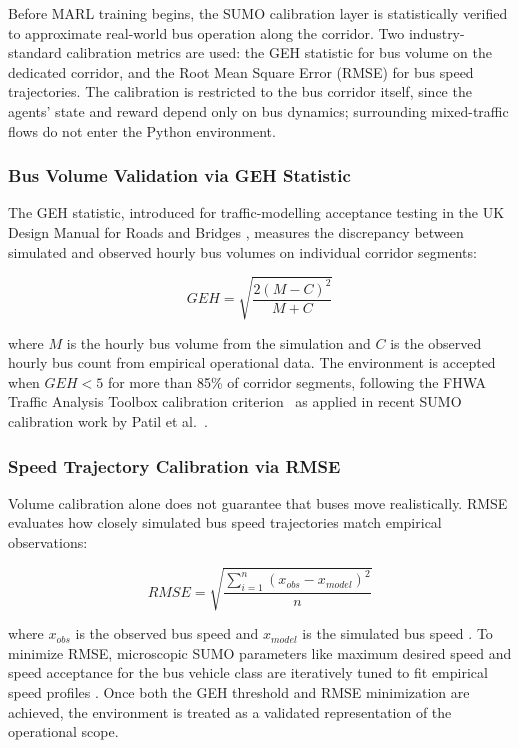 Before MARL training begins, the SUMO calibration layer is statistically verified to approximate real-world bus operation along the corridor. Two industry-standard calibration metrics are used: the GEH statistic for bus volume on the dedicated corridor, and the Root Mean Square Error (RMSE) for bus speed trajectories. The calibration is restricted to the bus corridor itself, since the agents' state and reward depend only on bus dynamics; surrounding mixed-traffic flows do not enter the Python environment.

\subsubsection{Bus Volume Validation via GEH Statistic}

The GEH statistic, introduced for traffic-modelling acceptance testing in the UK Design Manual for Roads and Bridges \cite{DMRBV12}, measures the discrepancy between simulated and observed hourly bus volumes on individual corridor segments:

\begin{equation} GEH = \sqrt{\frac{2(M - C)^2}{M + C}} \label{eq:geh} \end{equation}

where $M$ is the hourly bus volume from the simulation and $C$ is the observed hourly bus count from empirical operational data. The environment is accepted when $GEH < 5$ for more than 85\% of corridor segments, following the FHWA Traffic Analysis Toolbox calibration criterion~\cite{FHWA2019TAT} as applied in recent SUMO calibration work by Patil et al.~\cite{Patil2025Conformal}.

\subsubsection{Speed Trajectory Calibration via RMSE}

Volume calibration alone does not guarantee that buses move realistically. RMSE evaluates how closely simulated bus speed trajectories match empirical observations:

\begin{equation} RMSE = \sqrt{\frac{\sum_{i=1}^{n}(x_{obs} - x_{model})^2}{n}} \label{eq:rmse} \end{equation}

where $x_{obs}$ is the observed bus speed and $x_{model}$ is the simulated bus speed \cite{Ollero2024EDSA}. To minimize RMSE, microscopic SUMO parameters like maximum desired speed and speed acceptance for the bus vehicle class are iteratively tuned to fit empirical speed profiles \cite{Ollero2024EDSA}. Once both the GEH threshold and RMSE minimization are achieved, the environment is treated as a validated representation of the operational scope.

